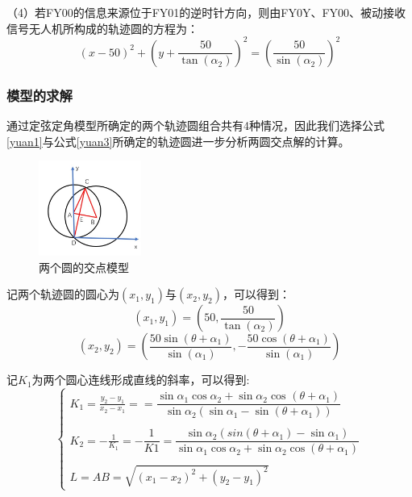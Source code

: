 \documentclass{my_paper}
\begin{document}
（4）若FY00的信息来源位于FY01的逆时针方向，则由FY0Y、FY00、被动接收信号无人机所构成的轨迹圆的方程为：
\begin{equation}
    (x - 50) ^{2} + (y + \frac{50}{\tan(\alpha_{2})}) ^ {2} = (\frac{50}{\sin(\alpha_2)}) ^ 2
    \label{yuan4}
\end{equation}


\subsubsection{模型的求解}
通过定弦定角模型所确定的两个轨迹圆组合共有4种情况，因此我们选择公式\ref{yuan1}与公式\ref{yuan3}所确定的轨迹圆进一步分析两圆交点解的计算。

\begin{figure}[h]
    \centering
    \includegraphics[width=0.3\textwidth]{liangyuan.jpg}
    \caption{两个圆的交点模型}
    \label{jiaodian}
\end{figure}

记两个轨迹圆的圆心为$(x_1,y_1)$与$(x_2,y_2)$，可以得到：
\begin{equation*}
    (x_1, y_1) = (50,\frac{50}{\tan(\alpha_2)})
\end{equation*}
\begin{equation*}
    (x_2, y_2) = (\frac{50\sin(\theta + \alpha_1)}{\sin(\alpha_1)}, - \frac{50\cos(\theta + \alpha_1)}{\sin(\alpha_1)})
\end{equation*}

记$K_1$为两个圆心连线形成直线的斜率，可以得到:
\begin{equation}
    \begin{cases}
        K_1 = \frac{y_2 - y_1} {x_2 - x_1} = =\dfrac{\sin \alpha_{1}\cos \alpha _{2}+\sin \alpha _{2}\cos _{}\left( \theta +\alpha _{1}\right) }{\sin \alpha _{2}\left( \sin \alpha_{1}-\sin \left( \theta +\alpha_{1}\right) \right) } \\
        \\
        K_2 = -\frac{1}{K_1} = -\dfrac{1}{K1}=\dfrac{\sin \alpha _{2}\left( sin\left( \theta +\alpha _{1}\right) -\sin \alpha _{1}\right) }{\sin \alpha_{1}\cos \alpha _{2}+\sin \alpha _{2}\cos \left( \theta +\alpha _{1}\right) }    \\
        \\
        L = AB = \sqrt{(x_1 - x_2) ^ 2 + (y_2 - y_1) ^ 2}
    \end{cases}
\end{equation}
\end{document}
